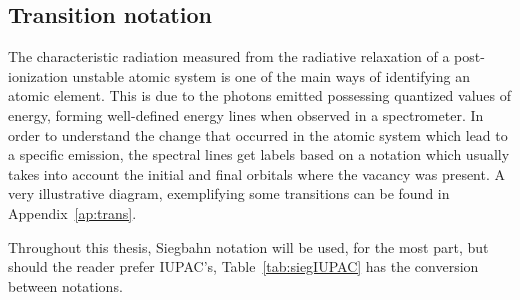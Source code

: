 


\subsection{Transition notation}

The characteristic radiation measured from the radiative relaxation of a post-ionization unstable atomic system is one of the main ways of identifying an atomic element. This is due to the photons emitted possessing quantized values of energy, forming well-defined energy lines when observed in a spectrometer. In order to understand the change that occurred in the atomic system which lead to a specific emission, the spectral lines get labels based on a notation which usually takes into account the initial and final orbitals where the vacancy was present.
A very illustrative diagram, exemplifying some transitions can be found in Appendix~\ref{ap:trans}.

Throughout this thesis, Siegbahn notation will be used, for the most part, but should the reader prefer
IUPAC's, Table~\ref{tab:siegIUPAC} has the conversion between notations.

